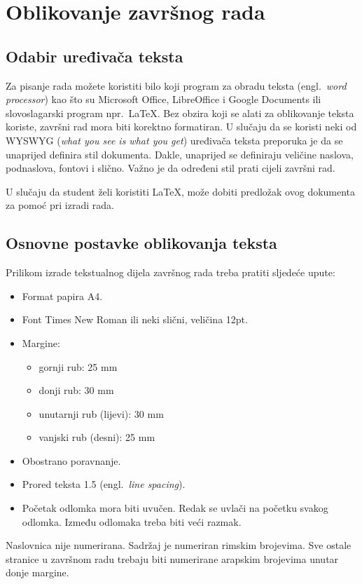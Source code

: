 \section{Oblikovanje završnog rada}

\subsection{Odabir uređivača teksta}

Za pisanje rada možete koristiti bilo koji program za obradu teksta (engl.~\textit{word processor}) kao što su Microsoft Office, LibreOffice i Google Documents ili slovoslagarski program npr.~\LaTeX. Bez obzira koji se alati za oblikovanje teksta koriste, završni rad mora biti korektno formatiran. U slučaju da se koristi neki od WYSWYG (\textit{what you see is what you get}) uređivača teksta preporuka je da se unaprijed definira 
stil dokumenta. Dakle, unaprijed se definiraju veličine naslova, podnaslova, fontovi i slično. Važno je da određeni stil prati cijeli završni rad. 


U slučaju da student želi koristiti \LaTeX, može dobiti predložak ovog dokumenta za pomoć pri izradi rada.

\subsection{Osnovne postavke oblikovanja teksta}
Prilikom izrade tekstualnog dijela završnog rada treba pratiti sljedeće upute:
\begin{itemize}
 \item Format papira A4.
 \item Font Times New Roman ili neki slični, veličina 12pt.
 \item Margine:
 \begin{itemize}
  \item gornji rub: 25 mm
  \item donji rub: 30 mm
  \item unutarnji rub (lijevi): 30 mm
  \item vanjski rub (desni): 25 mm
 \end{itemize}
 \item Obostrano poravnanje.
 \item Prored teksta 1.5 (engl.~\textit{line spacing}).
 \item Početak odlomka mora biti uvučen. Redak se uvlači na početku svakog odlomka. Između odlomaka treba biti veći razmak.
 
 \end{itemize}
Naslovnica nije numerirana. Sadržaj je numeriran rimskim brojevima. Sve ostale stranice u završnom radu trebaju biti numerirane arapskim brojevima unutar donje margine. 


